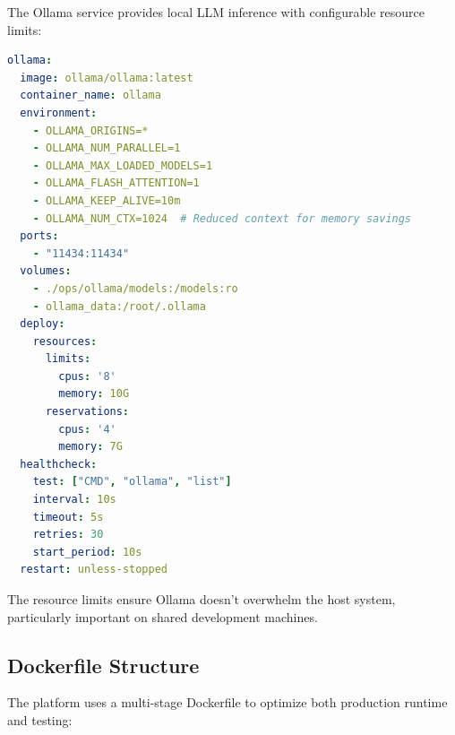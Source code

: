 The Ollama service provides local LLM inference with configurable resource limits:

\begin{lstlisting}[language=yaml, caption=Ollama service configuration]
ollama:
  image: ollama/ollama:latest
  container_name: ollama
  environment:
    - OLLAMA_ORIGINS=*
    - OLLAMA_NUM_PARALLEL=1
    - OLLAMA_MAX_LOADED_MODELS=1
    - OLLAMA_FLASH_ATTENTION=1
    - OLLAMA_KEEP_ALIVE=10m
    - OLLAMA_NUM_CTX=1024  # Reduced context for memory savings
  ports:
    - "11434:11434"
  volumes:
    - ./ops/ollama/models:/models:ro
    - ollama_data:/root/.ollama
  deploy:
    resources:
      limits:
        cpus: '8'
        memory: 10G
      reservations:
        cpus: '4'
        memory: 7G
  healthcheck:
    test: ["CMD", "ollama", "list"]
    interval: 10s
    timeout: 5s
    retries: 30
    start_period: 10s
  restart: unless-stopped
\end{lstlisting}

The resource limits ensure Ollama doesn't overwhelm the host system, particularly important on shared development machines.

\subsection{Dockerfile Structure}

The platform uses a multi-stage Dockerfile to optimize both production runtime and testing:

